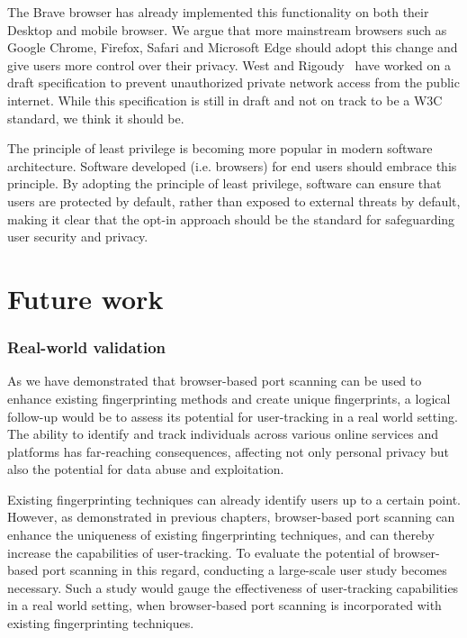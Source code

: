 The Brave browser has already implemented this functionality on both their Desktop and mobile browser. We argue that more mainstream browsers such as Google Chrome, Firefox, Safari and Microsoft Edge should adopt this change and give users more control over their privacy. 
West and Rigoudy~ have worked on a draft specification to prevent unauthorized private network access from the public internet. While this specification is still in draft and not on track to be a W3C standard, we think it should be. 

The principle of least privilege is becoming more popular in modern software architecture. Software developed (i.e. browsers) for end users should embrace this principle. By adopting the principle of least privilege, software can ensure that users are protected by default, rather than exposed to external threats by default, making it clear that the opt-in approach should be the standard for safeguarding user security and privacy.





\section{Future work}

\subsubsection{Real-world validation}

As we have demonstrated that browser-based port scanning can be used to enhance existing fingerprinting methods and create unique fingerprints, a logical follow-up would be to assess its potential for user-tracking in a real world setting.
The ability to identify and track individuals across various online services and platforms has far-reaching consequences, affecting not only personal privacy but also the potential for data abuse and exploitation.

Existing fingerprinting techniques can already identify users up to a certain point. However, as demonstrated in previous chapters, browser-based port scanning can enhance the uniqueness of existing fingerprinting techniques, and can thereby increase the capabilities of user-tracking.
To evaluate the potential of browser-based port scanning in this regard, conducting a large-scale user study becomes necessary. Such a study would gauge the effectiveness of user-tracking capabilities in a real world setting, when browser-based port scanning is incorporated with existing fingerprinting techniques.

